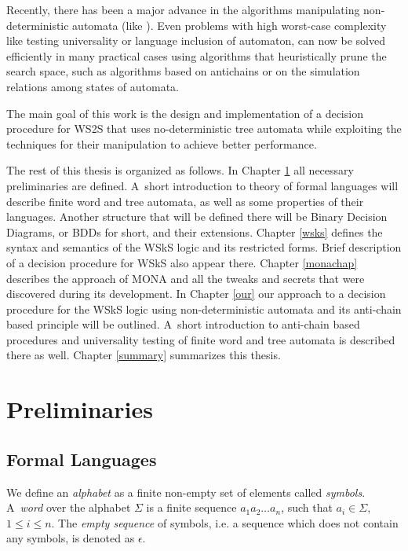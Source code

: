 Recently, there has been a major advance in the algorithms manipulating
non-deter\-mi\-ni\-stic automata (like \cite{vata}). Even problems with high
worst-case complexity like testing universality or language inclusion of automaton, can now be solved efficiently in many practical cases using algorithms that heuristically prune the search space, such as algorithms based on antichains or on the simulation relations among states of automata.

The main goal of this work is the design and implementation of a decision procedure for WS2S that uses no-deterministic tree automata while exploiting the techniques for their manipulation to achieve better performance.

The rest of this thesis is organized as follows. In Chapter \ref{preli} all necessary preliminaries are defined. A~short introduction to theory of formal languages will describe finite word and tree automata, as well as some properties of their languages. Another structure that will be defined there will be Binary Decision Diagrams, or BDDs for short, and their extensions. Chapter \ref{wsks} defines the syntax and semantics of the WSkS logic and its restricted forms. Brief description of a decision procedure for WSkS also appear there. Chapter \ref{monachap} describes the approach of \textsc{MONA} and all the tweaks and secrets that were discovered during its development. In Chapter \ref{our} our approach to  a decision procedure for the WSkS logic using non-deterministic automata and its anti-chain based principle will be outlined. A~short introduction to anti-chain based procedures and universality testing of finite word and tree automata is described there as well. Chapter \ref{summary} summarizes this thesis.

\chapter{Preliminaries}\label{preli}

 \section{Formal Languages}

 We define an \emph{alphabet} as a finite non-empty set of elements called \emph{symbols}. A~\emph{word} over the alphabet $\Sigma$ is a finite sequence $a_1a_2\ldots a_n$, such that $a_i \in \Sigma$, $1 \leq i \leq n$. The \emph{empty sequence} of symbols, i.e. a sequence  which does not contain any symbols, is denoted as $\epsilon$. 

